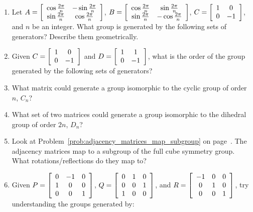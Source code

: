 \documentclass[../gatm.tex]{subfiles}
\begin{document}
\begin{enumerate}
\item Let $A=\left[\begin{array}{cc} \cos\frac{2\pi}{n} & -\sin\frac{2\pi}{n} \\ \sin\frac{2\pi}{n} & \cos\frac{2\pi}{n} \end{array}\right]$, $B=\left[\begin{array}{cc} \cos\frac{2\pi}{n} & \sin\frac{2\pi}{n} \\ \sin\frac{2\pi}{n} & -\cos\frac{2\pi}{n} \end{array}\right]$, $C=\left[\begin{array}{cc} 1 & 0 \\ 0 & -1 \end{array}\right]$, and $n$ be an integer. What group is generated by the following sets of generators? Describe them geometrically.
\begin{enumerate}
\end{enumerate}
\item Given $C=\left[\begin{array}{cc} 1 & 0 \\ 0 & -1 \end{array}\right]$ and $D=\left[\begin{array}{cc} 1 & 1 \\ 0 & -1 \end{array}\right]$, what is the order of the group generated by the following sets of generators?
\begin{enumerate}
\end{enumerate}
\item What matrix could generate a group isomorphic to the cyclic group of order $n$, $C_n$?
\item What set of two matrices could generate a group isomorphic to the dihedral group of order $2n$, $D_n$?
\item Look at Problem~\ref{prob:adjacency_matrices_map_subgroup} on page~\pageref{prob:adjacency_matrices_map_subgroup}. The adjacency matrices map to a subgroup of the full cube symmetry group. What rotations/reflections do they map to?
\item Given $P=\left[\begin{array}{ccc} 0 & -1 & 0 \\ 1 & 0 & 0 \\ 0 & 0 & 1 \end{array}\right]$, $Q=\left[\begin{array}{ccc} 0 & 1 & 0 \\ 0 & 0 & 1 \\ 1 & 0 & 0 \end{array}\right]$, and $R=\left[\begin{array}{ccc} -1 & 0 & 0 \\ 0 & 1 & 0 \\ 0 & 0 & 1 \end{array}\right]$, try understanding the groups generated by:
\begin{enumerate}
\end{enumerate}
\end{enumerate}
\end{document}
